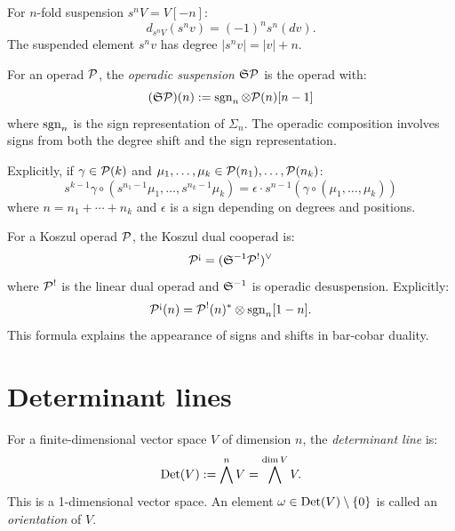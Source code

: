 \begin{corollary}
\label{cor:iterated-susp}
For $n$-fold suspension $s^n V = V[-n]$:
\[
d_{s^n V}(s^n v) = (-1)^n s^n(dv).
\]
The suspended element $s^n v$ has degree $|s^n v| = |v| + n$.
\end{corollary}

\begin{definition}
\label{def:susp-operadic}
For an operad $\mathcal{P}$, the \emph{operadic suspension} $\mathfrak{S} \mathcal{P}$ is the operad with:
\[
(\mathfrak{S} \mathcal{P})(n) := \operatorname{sgn}_n \otimes \mathcal{P}(n)[n-1]
\]
where $\operatorname{sgn}_n$ is the sign representation of $\Sigma_n$. The operadic composition 
involves signs from both the degree shift and the sign representation.

Explicitly, if $\gamma \in \mathcal{P}(k)$ and $\mu_1, \ldots, \mu_k \in \mathcal{P}(n_1), \ldots, \mathcal{P}(n_k)$:
\[
s^{k-1}\gamma \circ (s^{n_1-1}\mu_1, \ldots, s^{n_k-1}\mu_k) 
= \epsilon \cdot s^{n-1}(\gamma \circ (\mu_1, \ldots, \mu_k))
\]
where $n = n_1 + \cdots + n_k$ and $\epsilon$ is a sign depending on degrees 
and positions.
\end{definition}

\begin{proposition}
\label{prop:susp-koszul}
For a Koszul operad $\mathcal{P}$, the Koszul dual cooperad is:
\[
\cP^{\scriptstyle \text{\textexclamdown}} = (\fS^{-1} \cP^!)^\vee
\]
where $\mathcal{P}^!$ is the linear dual operad and $\mathfrak{S}^{-1}$ is operadic desuspension. 
Explicitly:
\[
\cP^{\scriptstyle \text{\textexclamdown}}(n) = \cP^!(n)^* \otimes \sgn_n[1-n].
\]
This formula explains the appearance of signs and shifts in bar-cobar duality.
\end{proposition}


\section{Determinant lines}
\label{sec:det-lines}

\begin{definition}
\label{def:det-vect}
For a finite-dimensional vector space $V$ of dimension $n$, the 
\emph{determinant line} is:
\[
\mathrm{Det}(V) := \bigwedge^n V = \bigwedge^{\dim V} V.
\]
This is a 1-dimensional vector space. An element $\omega \in \mathrm{Det}(V) \setminus \{0\}$ 
is called an \emph{orientation} of $V$.
\end{definition}

